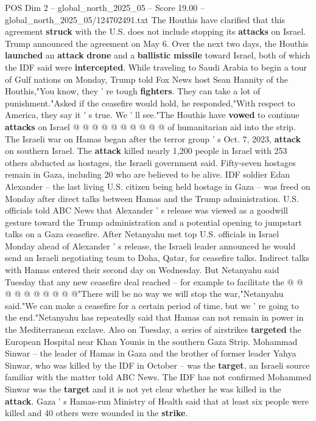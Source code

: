 \begin{textsample}{POS Dim 2 – global\_north\_2025\_05 – Score 19.00 – global\_north\_2025\_05/124702491.txt}
The Houthis have clarified that this agreement \textbf{struck} with the U.S. does not include stopping its \textbf{attacks} on Israel.
Trump announced the agreement on May 6.
Over the next two days, the Houthis \textbf{launched} an \textbf{attack} \textbf{drone} and a \textbf{ballistic} \textbf{missile} toward Israel, both of which the IDF said were \textbf{intercepted}.
While traveling to Saudi Arabia to begin a tour of Gulf nations on Monday, Trump told Fox News host Sean Hannity of the Houthis,"You know, they ' re tough \textbf{fighters}.
They can take a lot of punishment."Asked if the ceasefire would hold, he responded,"With respect to America, they say it ' s true.
We ' ll see."The Houthis have \textbf{vowed} to continue \textbf{attacks} on Israel @ @ @ @ @ @ @ @ @ @ of humanitarian aid into the strip.
The Israeli war on Hamas began after the terror group ' s Oct. 7, 2023, \textbf{attack} on southern Israel.
The \textbf{attack} killed nearly 1,200 people in Israel with 253 others abducted as hostages, the Israeli government said.
Fifty-seven hostages remain in Gaza, including 20 who are believed to be alive.
IDF soldier Edan Alexander -- the last living U.S. citizen being held hostage in Gaza -- was freed on Monday after direct talks between Hamas and the Trump administration.
U.S. officials told ABC News that Alexander ' s release was viewed as a goodwill gesture toward the Trump administration and a potential opening to jumpstart talks on a Gaza ceasefire.
After Netanyahu met top U.S. officials in Israel Monday ahead of Alexander ' s release, the Israeli leader announced he would send an Israeli negotiating team to Doha, Qatar, for ceasefire talks.
Indirect talks with Hamas entered their second day on Wednesday.
But Netanyahu said Tuesday that any new ceasefire deal reached -- for example to facilitate the @ @ @ @ @ @ @ @ @ @"There will be no way we will stop the war,"Netanyahu said."We can make a ceasefire for a certain period of time, but we ' re going to the end."Netanyahu has repeatedly said that Hamas can not remain in power in the Mediterranean exclave.
Also on Tuesday, a series of airstrikes \textbf{targeted} the European Hospital near Khan Younis in the southern Gaza Strip.
Mohammad Sinwar -- the leader of Hamas in Gaza and the brother of former leader Yahya Sinwar, who was killed by the IDF in October -- was the \textbf{target}, an Israeli source familiar with the matter told ABC News.
The IDF has not confirmed Mohammed Sinwar was the \textbf{target} and it is not yet clear whether he was killed in the \textbf{attack}.
Gaza ' s Hamas-run Ministry of Health said that at least six people were killed and 40 others were wounded in the \textbf{strike}.

\end{textsample}
